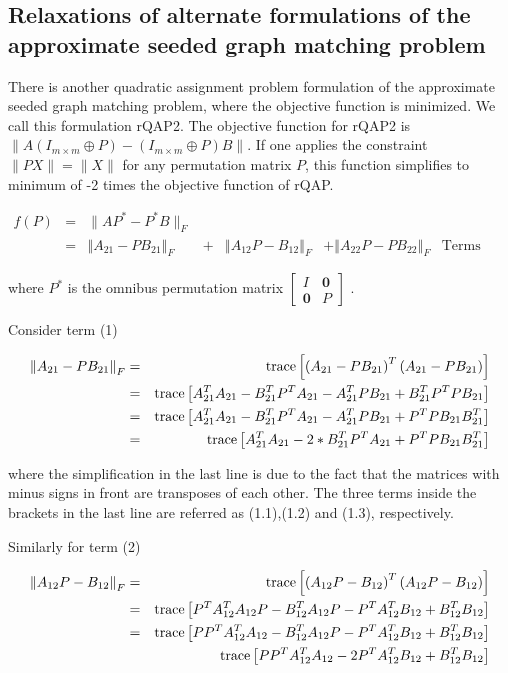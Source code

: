 \documentclass[12pt,oneside,final]{thesis}\usepackage[]{graphicx}\usepackage[]{color}
\begin{document}
\subsection{Relaxations of alternate formulations of the approximate seeded graph matching problem \label{subsec:rqap2}}

There is another quadratic assignment problem formulation of  the approximate seeded graph matching problem, where the objective function is  minimized. We call this formulation rQAP2.
The objective function for rQAP2 is
$\|A(I_{m \times m}\oplus P)-(I_{m \times m}\oplus P)B\|$. If one applies the constraint $\|PX\|=\|X\|$ for any permutation matrix $P$, this function simplifies to minimum of -2 times the objective function of  rQAP.

\begin{align*}
f(P) & = & \lVert AP^{*}-P^{*}B\rVert _{F}\\
 & = & \left\Vert A_{21}-PB_{21}\right\Vert _{F} & + & \left\Vert A_{12}P-B_{12}\right\Vert _{F} & +\left\Vert A_{22}P-PB_{22}\right\Vert _{F} & \textrm{Terms (1), (2) and (3)}
\end{align*}


where $P^{*}$ is the omnibus permutation matrix $\left[\begin{array}{cc}
I & \mathbf{0}\\
\mathbf{0} & P
\end{array}\right]$ .


Consider term (1)

\begin{align*}
\left\Vert A_{21}-PB_{21}\right\Vert _{F} & = & \textup{trace}\left[\left(A_{21}-PB_{21}\right)^{T}\left(A_{21}-PB_{21}\right)\right]\\
 & = & \textup{trace}\left[A_{21}^{T}A_{21}-B_{21}^{T}P^{T}A_{21}-A_{21}^{T}PB_{21}+B_{21}^{T}P^{T}PB_{21}\right]\\
 & = & \textup{trace}\left[A_{21}^{T}A_{21}-B_{21}^{T}P^{T}A_{21}-A_{21}^{T}PB_{21}+P^{T}PB_{21}B_{21}^{T}\right]\\
 & = & \textup{trace}\left[A_{21}^{T}A_{21}-2*B_{21}^{T}P^{T}A_{21}+P^{T}PB_{21}B_{21}^{T}\right]
\end{align*}


where the simplification in the last line is due to the fact that
the matrices with minus signs in front are transposes of each other.
The three terms inside the brackets in the last line are referred
as (1.1),(1.2) and (1.3), respectively.

Similarly for term (2)

\begin{align*}
\left\Vert A_{12}P-B_{12}\right\Vert _{F} & = & \textup{trace}\left[\left(A_{12}P-B_{12}\right)^{T}\left(A_{12}P-B_{12}\right)\right]\\
 & = & \textup{trace}\left[P^{T}A_{12}^{T}A_{12}P-B_{12}^{T}A_{12}P-P^{T}A_{12}^{T}B_{12}+B_{12}^{T}B_{12}\right]\\
 & = & \textup{trace}\left[PP^{T}A_{12}^{T}A_{12}-B_{12}^{T}A_{12}P-P^{T}A_{12}^{T}B_{12}+B_{12}^{T}B_{12}\right]\\
 &  & \textup{trace}\left[PP^{T}A_{12}^{T}A_{12}-2P^{T}A_{12}^{T}B_{12}+B_{12}^{T}B_{12}\right]
\end{align*}
\end{document}
